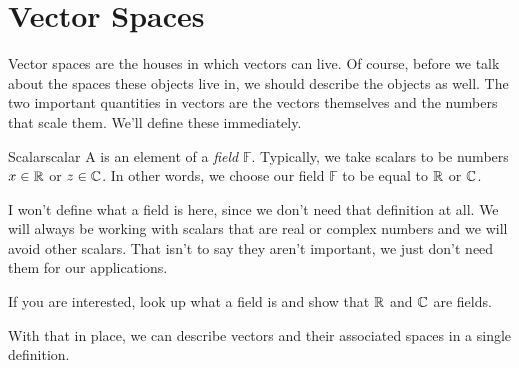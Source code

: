         \section{Vector Spaces}
        
        Vector spaces are the houses in which vectors can live.  Of course, before we talk about the spaces these objects live in, we should describe the objects as well. The two important quantities in vectors are the vectors themselves and the numbers that scale them.  We'll define these immediately.
        
        \begin{df}{Scalar}{scalar}
        A   is an element of a \emph{field} $\mathbb{F}$.  Typically, we take scalars to be numbers $x\in \mathbb{R}$ or $z\in \mathbb{C}$. In other words, we choose our field $\mathbb{F}$ to be equal to $\mathbb{R}$ or $\mathbb{C}$.
        \end{df}
        
        I won't define what a field is here, since we don't need that definition at all.  We will always be working with scalars that are real or complex numbers and we will avoid other scalars.  That isn't to say they aren't important, we just don't need them for our applications.
        
        \begin{exercise}
            If you are interested, look up what a field is and show that $\mathbb{R}$ and $\mathbb{C}$ are fields.
        \end{exercise}
        
        With that in place, we can describe vectors and their associated spaces in a single definition.  
        

